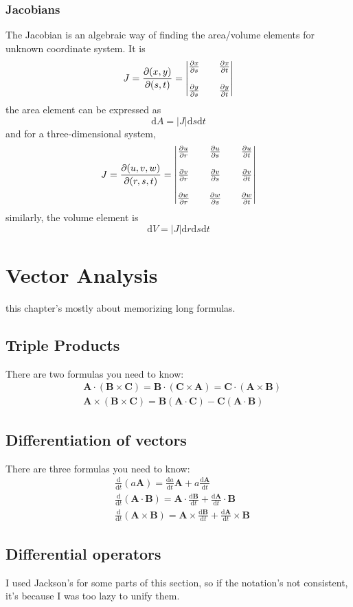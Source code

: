 \documentclass[oneside]{book}
\numberwithin{equation}{chapter} %
\newcommand{\ode}[2]{\ensuremath{\frac{\mathrm{d}#1}{\mathrm{d}#2}}}
\newcommand{\pde}[2]{\ensuremath{%
		\frac{\partial #1}{\partial #2}}}
\begin{document}
\subsection{Jacobians}
The Jacobian is an algebraic way of finding the area/volume elements for unknown coordinate system. It is 
$$J=\pde{(x,y)}{(s,t)}=\begin{vmatrix}\pde xs&&\pde xt\\ \\ \pde ys&&\pde yt\end{vmatrix}$$
the area element can be expressed as 
$$\mathrm dA=|J|\mathrm ds\mathrm dt$$
and for a three-dimensional system,
$$J=\pde{(u,v,w)}{(r,s,t)}=\begin{vmatrix}\pde ur&&\pde us&&\pde ut\\ \\\pde vr&&\pde vs&&\pde vt \\ \\\pde wr&&\pde ws&&\pde wt\end{vmatrix}$$
similarly, the volume element is 
$$\mathrm dV=|J|\mathrm dr\mathrm ds\mathrm dt$$
\chapter{Vector Analysis}
this chapter's mostly about memorizing long formulas. 
\section{Triple Products}
There are two formulas you need to know:
\begin{align}
	&\mathbf{A\cdot(B\times C)=B\cdot(C\times A)=C\cdot(A\times B)}\\
	&\mathbf{A\times (B\times C)=B(A\cdot C)-C(A\cdot B)}
\end{align}
\section{Differentiation of vectors}
There are three formulas you need to know:
\begin{align}
	&\ode{}{t}(a\mathbf A)=\ode at\mathbf A+a\ode{\mathbf{A}} t\\
	&\ode{}{t}\mathbf{(A\cdot B)}=\mathbf A\cdot\ode{\mathbf B}{t}+\ode{\mathbf A}{t}\cdot \mathbf B\\
	&\ode{}{t}\mathbf{(A\times B)}=\mathbf A\times\ode{\mathbf B}{t}+\ode{\mathbf A}{t}\times \mathbf B
\end{align}
\section{Differential operators}
I used Jackson's for some parts of this section, so if the notation's not consistent, it's because I was too lazy to unify them. \\
\end{document}
